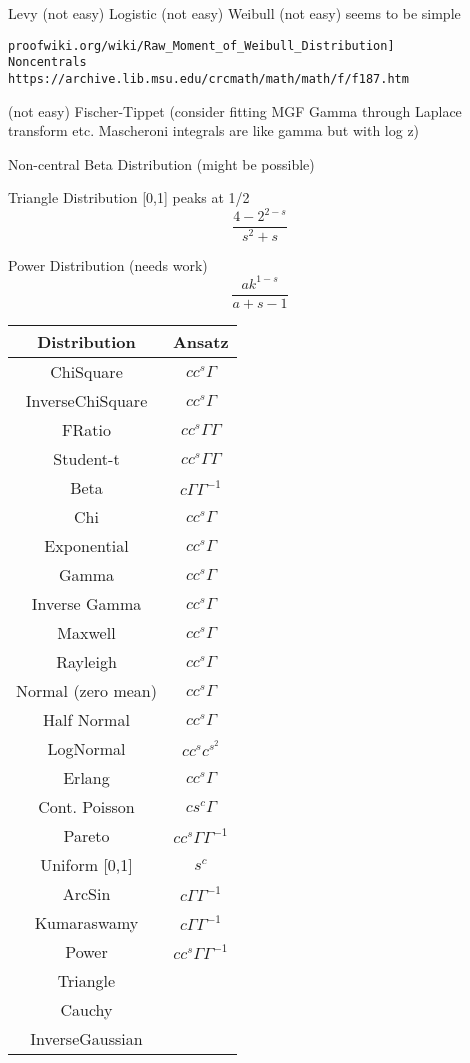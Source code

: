 \documentclass{article}
\begin{document}
Levy (not easy)
Logistic (not easy)
Weibull (not easy) seems to be simple \begin{verbatim}
proofwiki.org/wiki/Raw_Moment_of_Weibull_Distribution]
Noncentrals
https://archive.lib.msu.edu/crcmath/math/math/f/f187.htm
\end{verbatim} (not easy)
Fischer-Tippet (consider fitting MGF Gamma through Laplace transform etc. Mascheroni integrals are like gamma but with log z)

Non-central Beta Distribution (might be possible)

Triangle Distribution [0,1] peaks at 1/2
$$
\frac{4-2^{2-s}}{s^2+s}
$$

Power Distribution (needs work)
$$
\frac{a k^{1-s}}{a+s-1}
$$




\begin{tabular}{|c|c|}
Distribution & Ansatz \\
\hline
ChiSquare & $c c^s \Gamma$ \\
InverseChiSquare & $c c^s \Gamma$\\
FRatio & $c  c^s \Gamma \Gamma$ \\
Student-t & $c  c^s \Gamma \Gamma$\\
Beta & $c  \Gamma \Gamma^{-1}$\\
Chi & $c c^s \Gamma$\\
Exponential & $c  c^s \Gamma$ \\
Gamma & $c  c^s \Gamma$ \\
Inverse Gamma & $c c^s \Gamma$\\
Maxwell & $c  c^s \Gamma$ \\
Rayleigh & $c  c^s \Gamma$ \\
Normal (zero mean) & $c c^s \Gamma$ \\
Half Normal & $c c^s \Gamma$ \\
LogNormal & $c c^s c^{s^2} $\\
Erlang & $c c^s \Gamma$ \\
Cont. Poisson & $c s^{c} \Gamma$ \\
Pareto & $c c^s \Gamma \Gamma^{-1}$ \\
Uniform [0,1] & $s^{c}$ \\
ArcSin & $c \Gamma \Gamma^{-1}$\\
Kumaraswamy & $c \Gamma \Gamma^{-1}$ \\
Power & $c c^s \Gamma \Gamma^{-1}$\\
Triangle & \\
Cauchy & \\
InverseGaussian & \\
\end{tabular}
\end{document}
